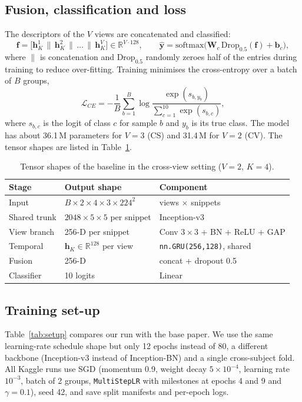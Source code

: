 \documentclass[runningheads]{llncs}
\begin{document}
\subsection{Fusion, classification and loss}
The descriptors of the $V$ views are concatenated and classified:
\begin{equation}
\mathbf f=\big[\mathbf h^{1}_{K}\,\|\,\mathbf h^{2}_{K}\,\|\,\dots\,\|\,\mathbf h^{V}_{K}\big]\in\mathbb R^{V\cdot128},\qquad
\hat{\mathbf y}=\mathrm{softmax}\big(\mathbf W_c\,\mathrm{Drop}_{0.5}(\mathbf f)+\mathbf b_c\big),
\end{equation}
where $\|$ is concatenation and $\mathrm{Drop}_{0.5}$ randomly zeroes half of the entries during training to reduce over-fitting. Training minimises the cross-entropy over a batch of $B$ groups,
\begin{equation}
\mathcal L_{CE}=-\frac1B\sum_{b=1}^{B}\log\frac{\exp(s_{b,y_b})}{\sum_{c=1}^{10}\exp(s_{b,c})},
\end{equation}
where $s_{b,c}$ is the logit of class $c$ for sample $b$ and $y_b$ is its true class. The model has about 36.1\,M parameters for $V{=}3$ (CS) and 31.4\,M for $V{=}2$ (CV). The tensor shapes are listed in Table~\ref{tab:shapes}.

\begin{table}[t]
\caption{Tensor shapes of the baseline in the cross-view setting ($V{=}2$, $K{=}4$).}\label{tab:shapes}
\centering
\small
\begin{tabular}{lll}
\toprule
Stage & Output shape & Component \\
\midrule
Input & $B\times2\times4\times3\times224^2$ & views $\times$ snippets \\
Shared trunk & $2048\times5\times5$ per snippet & Inception-v3 \\
View branch & 256-D per snippet & Conv $3{\times}3$ + BN + ReLU + GAP \\
Temporal & $\mathbf h_K\in\mathbb R^{128}$ per view & \texttt{nn.GRU(256,128)}, shared \\
Fusion & 256-D & concat + dropout 0.5 \\
Classifier & 10 logits & Linear \\
\bottomrule
\end{tabular}
\end{table}

\subsection{Training set-up}
Table~\ref{tab:setup} compares our run with the base paper. We use the same learning-rate schedule shape but only 12 epochs instead of 80, a different backbone (Inception-v3 instead of Inception-BN) and a single cross-subject fold. All Kaggle runs use SGD (momentum 0.9, weight decay $5{\times}10^{-4}$, learning rate $10^{-3}$, batch of 2 groups, \texttt{MultiStepLR} with milestones at epochs 4 and 9 and $\gamma{=}0.1$), seed 42, and save split manifests and per-epoch logs.
\end{document}
